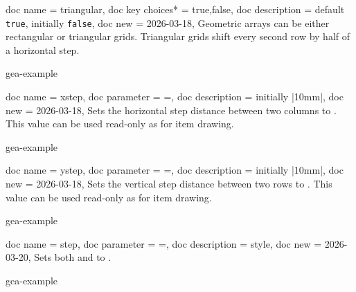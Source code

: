 \documentclass[a4paper,11pt]{article}
\begin{document}
\begin{docGeaKeys}
  {
    {
      doc name         = triangular,
      doc key choices* = {true,false},
      doc description  = {default \texttt{true}, initially \texttt{false}},
      doc new          = 2026-03-18,
    }
  }
  Geometric arrays can be either rectangular or triangular grids. Triangular
  grids shift every second row by half of a horizontal step.

\begin{dispExample*}{gea-example}
\end{dispExample*}
\end{docGeaKeys}


\begin{docGeaKeys}
  {
    {
      doc name        = xstep,
      doc parameter   = {=},
      doc description = {initially |10mm|},
      doc new         = 2026-03-18,
    }
  }
  Sets the horizontal step distance between two columns to .
  This value can be used read-only as 
  for item drawing.

\begin{dispExample*}{gea-example}
\end{dispExample*}
\end{docGeaKeys}


\begin{docGeaKeys}
  {
    {
      doc name        = ystep,
      doc parameter   = {=},
      doc description = {initially |10mm|},
      doc new         = 2026-03-18,
    }
  }
  Sets the vertical step distance between two rows to .
  This value can be used read-only as 
  for item drawing.

\begin{dispExample*}{gea-example}
\end{dispExample*}
\end{docGeaKeys}


\clearpage
\begin{docGeaKeys}
  {
    {
      doc name        = step,
      doc parameter   = {=},
      doc description = {style},
      doc new         = 2026-03-20,
    }
  }
  Sets both  and 
  to .

\begin{dispExample*}{gea-example}
\end{dispExample*}
\end{docGeaKeys}
\end{document}
